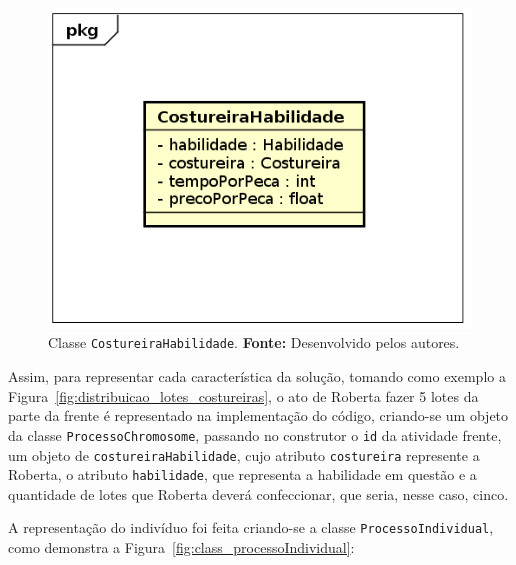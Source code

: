 \begin{figure}[h!]
	\centerline{\includegraphics[scale=0.5]{./imagens/costureiraHabilidade_class.png}}
	\caption[Classe \texttt{CostureiraHabilidade}.]
	{Classe \texttt{CostureiraHabilidade}. \textbf{Fonte:} Desenvolvido pelos
	autores.}
	\label{fig:class_costureiraHabilidade}
\end{figure}

\par Assim, para representar cada característica da solução, tomando como
exemplo a Figura~\ref{fig:distribuicao_lotes_costureiras}, o ato de Roberta
fazer 5 lotes da parte da frente é representado na implementação do código, criando-se um objeto da classe \texttt{ProcessoChromosome}, passando no construtor o \texttt{id} da atividade frente, um objeto de
\texttt{costureiraHabilidade}, cujo atributo \texttt{costureira} represente a
Roberta, o atributo \texttt{habilidade}, que representa a habilidade em questão e a
quantidade de lotes que Roberta deverá confeccionar, que seria, nesse caso, cinco.

\par A representação do indivíduo foi feita criando-se a classe \texttt{ProcessoIndividual}, 
como demonstra a Figura~\ref{fig:class_processoIndividual}:


